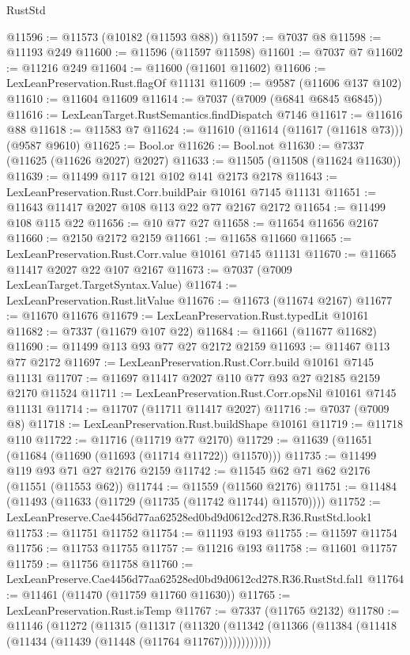 \begin{lexlean}{RustStd}
\begin{coremodule}
@11596 := @11573 (@10182 (@11593 @88))
@11597 := @7037 @8
@11598 := @11193 @249
@11600 := @11596 (@11597 @11598)
@11601 := @7037 @7
@11602 := @11216 @249
@11604 := @11600 (@11601 @11602)
@11606 := LexLeanPreservation.Rust.flagOf @11131
@11609 := @9587 (@11606 @137 @102)
@11610 := @11604 @11609
@11614 := @7037 (@7009 (@6841 @6845 @6845))
@11616 := LexLeanTarget.RustSemantics.findDispatch @7146
@11617 := @11616 @88
@11618 := @11583 @7
@11624 := @11610 (@11614 (@11617 (@11618 @73))) (@9587 @9610)
@11625 := Bool.or
@11626 := Bool.not
@11630 := @7337 (@11625 (@11626 @2027) @2027)
@11633 := @11505 (@11508 (@11624 @11630))
@11639 := @11499 @117 @121 @102 @141 @2173 @2178
@11643 := LexLeanPreservation.Rust.Corr.buildPair @10161 @7145 @11131
@11651 := @11643 @11417 @2027 @108 @113 @22 @77 @2167 @2172
@11654 := @11499 @108 @115 @22
@11656 := @10 @77 @27
@11658 := @11654 @11656 @2167
@11660 := @2150 @2172 @2159
@11661 := @11658 @11660
@11665 := LexLeanPreservation.Rust.Corr.value @10161 @7145 @11131
@11670 := @11665 @11417 @2027 @22 @107 @2167
@11673 := @7037 (@7009 LexLeanTarget.TargetSyntax.Value)
@11674 := LexLeanPreservation.Rust.litValue
@11676 := @11673 (@11674 @2167)
@11677 := @11670 @11676
@11679 := LexLeanPreservation.Rust.typedLit @10161
@11682 := @7337 (@11679 @107 @22)
@11684 := @11661 (@11677 @11682)
@11690 := @11499 @113 @93 @77 @27 @2172 @2159
@11693 := @11467 @113 @77 @2172
@11697 := LexLeanPreservation.Rust.Corr.build @10161 @7145 @11131
@11707 := @11697 @11417 @2027 @110 @77 @93 @27 @2185 @2159 @2170 @11524
@11711 := LexLeanPreservation.Rust.Corr.opsNil @10161 @7145 @11131
@11714 := @11707 (@11711 @11417 @2027)
@11716 := @7037 (@7009 @8)
@11718 := LexLeanPreservation.Rust.buildShape @10161
@11719 := @11718 @110
@11722 := @11716 (@11719 @77 @2170)
@11729 := @11639 (@11651 (@11684 (@11690 (@11693 (@11714 @11722)) @11570)))
@11735 := @11499 @119 @93 @71 @27 @2176 @2159
@11742 := @11545 @62 @71 @62 @2176 (@11551 (@11553 @62))
@11744 := @11559 (@11560 @2176)
@11751 := @11484 (@11493 (@11633 (@11729 (@11735 (@11742 @11744) @11570))))
@11752 := LexLeanPreserve.Cae4456d77aa62528ed0bd9d0612cd278.R36.RustStd.look1
@11753 := @11751 @11752
@11754 := @11193 @193
@11755 := @11597 @11754
@11756 := @11753 @11755
@11757 := @11216 @193
@11758 := @11601 @11757
@11759 := @11756 @11758
@11760 := LexLeanPreserve.Cae4456d77aa62528ed0bd9d0612cd278.R36.RustStd.fal1
@11764 := @11461 (@11470 (@11759 @11760 @11630))
@11765 := LexLeanPreservation.Rust.isTemp
@11767 := @7337 (@11765 @2132)
@11780 := @11146
    (@11272
      (@11315
        (@11317
          (@11320 (@11342 (@11366 (@11384 (@11418 (@11434 (@11439 (@11448 (@11764 @11767))))))))))))

\end{coremodule}
\end{lexlean}
